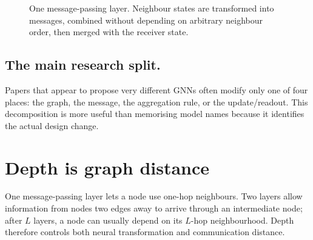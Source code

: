 \begin{figure}[htbp]
\centering
{}
\caption{One message-passing layer. Neighbour states are transformed into messages, combined without depending on arbitrary neighbour order, then merged with the receiver state.}
\label{fig:gnn-message-passing}
\end{figure}

\subsection{The main research split.}
Papers that appear to propose very different GNNs often modify only one of four places: the graph, the message, the aggregation rule, or the update/readout.
This decomposition is more useful than memorising model names because it identifies the actual design change.

\section{Depth is graph distance}
One message-passing layer lets a node use one-hop neighbours.
Two layers allow information from nodes two edges away to arrive through an intermediate node; after $L$ layers, a node can usually depend on its $L$-hop neighbourhood.
Depth therefore controls both neural transformation and communication distance.

